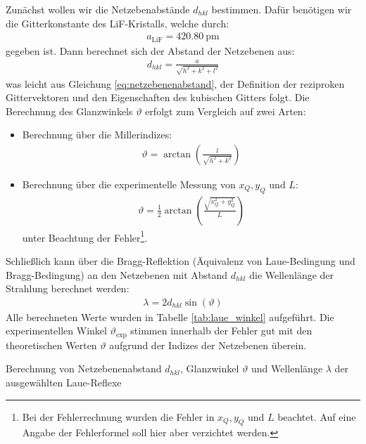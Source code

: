 \documentclass[11pt, a4paper]{article}
\begin{document}
Zunächst wollen wir die Netzebenabstände $d_{hkl}$ bestimmen.
Dafür benötigen wir die Gitterkonstante des LiF-Kristalls, welche durch:
\begin{align*}
  a_\mathrm{LiF} = \SI{420.80}{\pico\metre}
\end{align*}
gegeben ist\cite{crc}.
Dann berechnet sich der Abstand der Netzebenen aus:
\begin{align}
  d_{hkl} = \frac{a}{\sqrt{h^2+k^2+l^2}}
\end{align}
was leicht aus Gleichung \ref{eq:netzebenenabstand}, der Definition der reziproken Gittervektoren und den Eigenschaften des kubischen Gitters folgt.
Die Berechnung des Glanzwinkels $\vartheta$ erfolgt zum Vergleich auf zwei Arten:
\begin{itemize}
  \item Berechnung über die Millerindizes:
  \begin{align}
    \vartheta = \arctan{\left( \frac{l}{\sqrt{h^2+k^2}} \right)}
    \label{eq:millerglanzwinkel}
  \end{align}
  
  \item Berechnung über die experimentelle Messung von $x_Q, y_Q$ und $L$:
  \begin{align}
    \vartheta = \frac{1}{2} \arctan{\left( \frac{\sqrt{x_Q^2 + y_Q^2}}{L} \right)}
  \end{align}
  unter Beachtung der Fehler\footnote{Bei der Fehlerrechnung wurden die Fehler in $x_Q, y_Q$ und $L$ beachtet. Auf eine Angabe der Fehlerformel soll hier aber verzichtet werden.}.
\end{itemize}
Schließlich kann über die Bragg-Reflektion (Äquivalenz von Laue-Bedingung und Bragg-Bedingung) an den Netzebenen mit Abstand $d_{hkl}$ die Wellenlänge der Strahlung berechnet werden:
\begin{align}
  \lambda = 2 d_{hkl} \sin(\vartheta)
\end{align}
Alle berechneten Werte wurden in Tabelle \ref{tab:laue_winkel} aufgeführt.
Die experimentellen Winkel $\vartheta_\mathrm{exp}$ stimmen innerhalb der Fehler gut mit den theoretischen Werten $\vartheta$ aufgrund der Indizes der Netzebenen überein.

\begin{table}[h]
\centering

\caption{Berechnung von Netzebenenabstand $d_{hkl}$, Glanzwinkel $\vartheta$ und Wellenlänge $\lambda$ der ausgewählten Laue-Reflexe}
\label{tab:laue_winkel}
\end{table}
\end{document}
